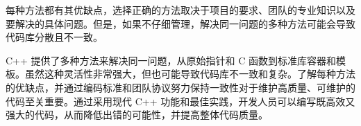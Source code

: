 每种方法都有其优缺点，选择正确的方法取决于项目的要求、团队的专业知识以及要解决的具体问题。但是，如果不仔细管理，解决同一问题的多种方法可能会导致代码库分散且不一致。

C++ 提供了多种方法来解决同一问题，从原始指针和 C 函数到标准库容器和模板。虽然这种灵活性非常强大，但也可能导致代码库不一致和复杂。了解每种方法的优缺点，并通过编码标准和团队协议努力保持一致性对于维护高质量、可维护的代码至关重要。通过采用现代 C++ 功能和最佳实践，开发人员可以编写既高效又强大的代码，从而降低出错的可能性，并提高整体代码质量。

